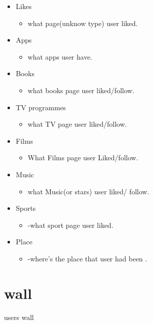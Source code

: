\begin{itemize}
\item Likes
    \begin{itemize}
    \item what page(unknow type) user liked.
    \end{itemize}

\item Apps
    \begin{itemize}
    \item what apps user have.
    \end{itemize}

\item Books
    \begin{itemize}
    \item what books page user liked/follow.
    \end{itemize}

\item TV programmes
    \begin{itemize}
    \item what TV page user liked/follow.
    \end{itemize}

\item Films
    \begin{itemize}
    \item What Films page user Liked/follow.
    \end{itemize}

\item Music
    \begin{itemize}
    \item what Music(or stars) user liked/ follow.
    \end{itemize}

\item Sports
    \begin{itemize}
    \item -what sport page user liked.
    \end{itemize}

\item Place
    \begin{itemize}
     \item -where's the place that user had been .
     \end{itemize}
\end{itemize}

\section{wall}
users wall

